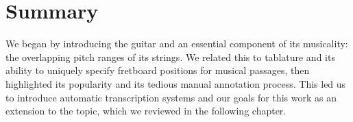 \documentclass[12pt]{cmuthesis}
\begin{document}



\noindent
\chapter{Summary}
\label{chap:conclusion}
We began by introducing the guitar and an essential component of its musicality: the overlapping pitch ranges of its strings. We related this to tablature and its ability to uniquely specify fretboard positions for musical passages, then highlighted its popularity and its tedious manual annotation process. This led us to introduce automatic transcription systems and our goals for this work as an extension to the topic, which we reviewed in the following chapter.
\end{document}
